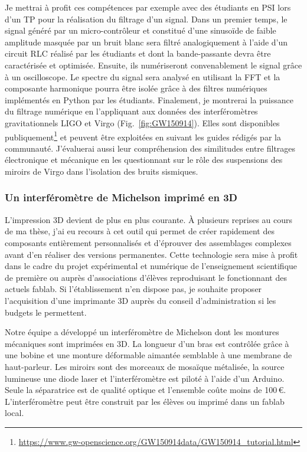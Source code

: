\documentclass[12pt,a4paper]{article}
\begin{document}
Je mettrai à profit ces compétences par exemple avec des étudiants en PSI lors d'un TP pour la réalisation du filtrage d'un signal.
Dans un premier temps, le signal généré par un micro-contrôleur et constitué d'une sinusoïde de faible amplitude masquée par un bruit blanc sera filtré analogiquement à l'aide d'un circuit RLC réalisé par les étudiants et dont la bande-passante devra être caractérisée et optimisée.
Ensuite, ils numériseront convenablement le signal grâce à un oscilloscope.
Le spectre du signal sera analysé en utilisant la FFT et la composante harmonique pourra être isolée grâce à des filtres numériques implémentés en Python par les étudiants.
Finalement, je montrerai la puissance du filtrage numérique en l'appliquant aux données des interféromètres gravitationnels LIGO et Virgo (Fig.~\ref{fig:GW150914}).
Elles sont disponibles publiquement\footnote{\url{https://www.gw-openscience.org/GW150914data/GW150914_tutorial.html}} et peuvent être exploitées en suivant les guides rédigés par la communauté.
J'évaluerai aussi leur compréhension des similitudes entre filtrages électronique et mécanique en les questionnant sur le rôle des suspensions des miroirs de Virgo dans l'isolation des bruits sismiques.

\subsubsection{Un interféromètre de Michelson imprimé en 3D}

L'impression 3D devient de plus en plus courante.
À plusieurs reprises au cours de ma thèse, j'ai eu recours à cet outil qui permet de créer rapidement des composants entièrement personnalisés et d'éprouver des assemblages complexes avant d'en réaliser des versions permanentes.
Cette technologie sera mise à profit dans le cadre du projet expérimental et numérique de l'enseignement scientifique de première ou auprès d'associations d'élèves reproduisant le fonctionnant des actuels fablab.
Si l'établissement n'en dispose pas, je souhaite proposer l'acquisition d'une imprimante 3D auprès du conseil d'administration si les budgets le permettent.

Notre équipe a développé un interféromètre de Michelson dont les montures mécaniques sont imprimées en 3D.
La longueur d'un bras est contrôlée grâce à une bobine et une monture déformable aimantée semblable à une membrane de haut-parleur.
Les miroirs sont des morceaux de mosaïque métalisée, la source lumineuse une diode laser et l'interféromètre est piloté à l'aide d'un Arduino.
Seule la séparatrice est de qualité optique et l'ensemble coûte moins de 100\,\euro.
L'interféromètre peut être construit par les élèves ou imprimé dans un fablab local.
\end{document}
